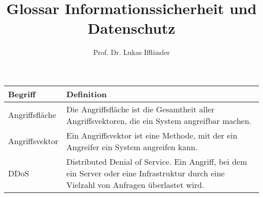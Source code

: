 \documentclass{scrartcl}
\title{Glossar Informationssicherheit und Datenschutz}
\author{Prof. Dr. Lukas Iffländer}
\begin{document}
\maketitle

\begin{xltabular}{\textwidth}{lX}
    \toprule
    Begriff & Definition \\
    \midrule
    \endhead
    \bottomrule
    \endfoot
    Angriffsfläche & Die Angriffsfläche ist die Gesamtheit aller Angriffsvektoren, die ein System angreifbar machen. \\
    Angriffsvektor & Ein Angriffsvektor ist eine Methode, mit der ein Angreifer ein System angreifen kann. \\
    DDoS & Distributed Denial of Service. Ein Angriff, bei dem ein Server oder eine Infrastruktur durch eine Vielzahl von Anfragen überlastet wird. \\
\end{xltabular}
\end{document}
